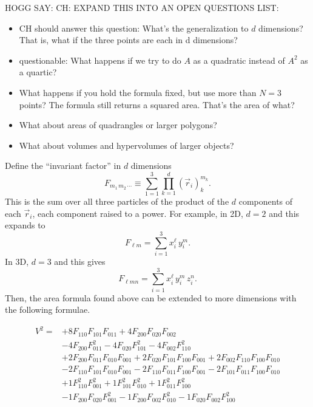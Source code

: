 \documentclass[12pt]{article}
\begin{document}
HOGG SAY: CH: EXPAND THIS INTO AN OPEN QUESTIONS LIST:
\begin{itemize}
\item CH should answer this question: What's the generalization to $d$ dimensions? That is, what if the three points are each in d dimensions?
\item questionable: What happens if we try to do $A$ as a quadratic instead of $A^2$ as a quartic?
\item What happens if you hold the formula fixed, but use more than $N=3$ points?
The formula still returns a squared area.
That's the area of what?
\item What about areas of quadrangles or larger polygons?
\item What about volumes and hypervolumes of larger objects?
\end{itemize}

\newpage

\newpage

Define the ``invariant factor'' in $d$ dimensions
\begin{equation}
    F_{m_1 \, m_2 \, \cdots} \equiv \sum_{1=1}^{3} \prod_{k=1}^{d} (\vec{r}_{i})_{k}^{m_k}.
\end{equation}
This is the sum over all three particles of the product of the $d$ components of each $\vec{r}_i$, each component raised to a power. For example, in 2D, $d=2$ and this expands to
\begin{equation}
    F_{\ell m} = \sum_{i=1}^{3} x_i^\ell \, y_i^m.
\end{equation}
In 3D, $d=3$ and this gives
\begin{equation}
    F_{\ell m n} = \sum_{i=1}^{3} x_i^\ell \, y_i^m \, z_i^n.
\end{equation}
Then, the area formula found above can be extended to more dimensions with the following formulae.

\begin{equation}
\begin{aligned}
V^2 = &
+8 F_{110} F_{101} F_{011}
+4 F_{200} F_{020} F_{002}
\\ &
-4 F_{200} F_{011}^2
-4 F_{020} F_{101}^2
-4 F_{002} F_{110}^2
\\ &
+2 F_{200} F_{011} F_{010} F_{001}
+2 F_{020} F_{101} F_{100} F_{001}
+2 F_{002} F_{110} F_{100} F_{010}
\\ &
-2 F_{110} F_{101} F_{010} F_{001}
-2 F_{110} F_{011} F_{100} F_{001}
-2 F_{101} F_{011} F_{100} F_{010}
\\ &
+1 F_{110}^2 F_{001}^2
+1 F_{101}^2 F_{010}^2
+1 F_{011}^2 F_{100}^2
\\ &
-1 F_{200} F_{020} F_{001}^2
-1 F_{200} F_{002} F_{010}^2
-1 F_{020} F_{002} F_{100}^2
\end{aligned}
\end{equation}
\end{document}
